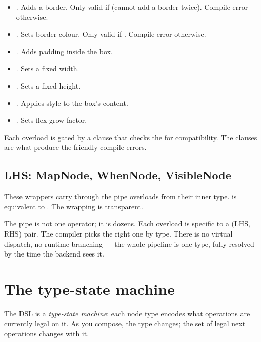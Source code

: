 \begin{itemize}[leftmargin=*]
  \item {}. Adds a border. Only
    valid if  (cannot add a border
    twice). Compile error otherwise.
  \item {}. Sets border colour.
    Only valid if . Compile error
    otherwise.
  \item {}. Adds padding inside the
    box.
  \item {}. Sets a fixed width.
  \item {}. Sets a fixed height.
  \item {}. Applies style to the
    box's content.
  \item {}. Sets flex-grow factor.
\end{itemize}

Each overload is gated by a  clause that checks
the  for compatibility. The clauses are what produce
the friendly compile errors.

\subsection*{LHS: MapNode, WhenNode, VisibleNode}

These wrappers carry through the pipe overloads from their
inner type.  is equivalent to
. The wrapping is transparent.

\begin{recap}
The pipe is not one operator; it is dozens. Each overload is
specific to a (LHS, RHS) pair. The compiler picks the right one
by type. There is no virtual dispatch, no runtime branching ---
the whole pipeline is one type, fully resolved by the time the
backend sees it.
\end{recap}

\section{The type-state machine}

The DSL is a \emph{type-state machine}: each node type encodes
what operations are currently legal on it. As you compose, the
type changes; the set of legal next operations changes with it.

